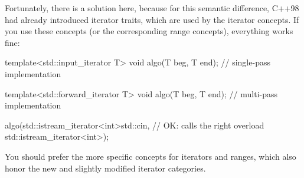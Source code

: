 Fortunately, there is a solution here, because for this semantic difference, C++98 had already introduced iterator traits, which are used by the iterator concepts. If you use these concepts (or the corresponding range concepts), everything works fine:

\begin{cpp}
template<std::input_iterator T>
void algo(T beg, T end); // single-pass implementation
	
template<std::forward_iterator T>
void algo(T beg, T end); // multi-pass implementation

algo(std::istream_iterator<int>{std::cin}, // OK: calls the right overload
	std::istream_iterator<int>{});
\end{cpp}

You should prefer the more specific concepts for iterators and ranges, which also honor the new and slightly modified iterator categories.


















